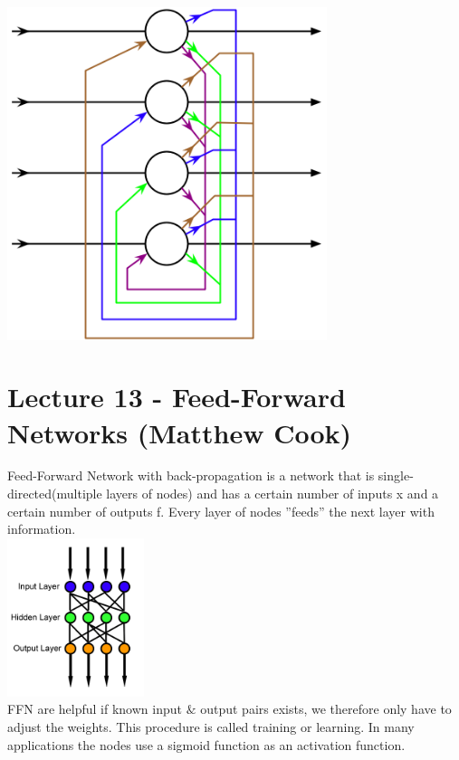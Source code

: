 \documentclass[english,11pt]{article}
\begin{document}
\includegraphics[width=0.7\textwidth]{hopfield-network.png}\\








\section{Lecture 13 - Feed-Forward Networks (Matthew Cook)}


Feed-Forward Network with back-propagation is a network that is single-directed(multiple layers of nodes) and has a certain number of inputs x and a certain number of outputs f. Every layer of nodes ''feeds'' the next layer with information.\\
\includegraphics[width=0.3\textwidth]{Feed_forward_neural_net.png}\\
FFN are helpful if known input $\&$ output pairs exists, we therefore only have to adjust the weights. This procedure is called training or learning.
In many applications the nodes use a sigmoid function as an activation function.\\[2\baselineskip]
\end{document}
